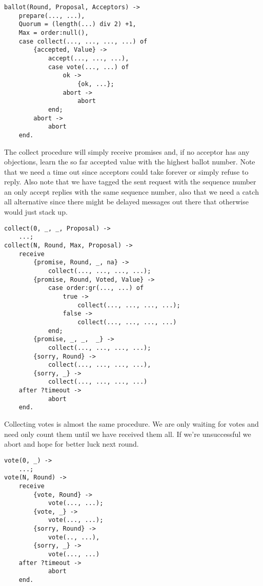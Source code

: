 \documentclass[a4paper,11pt]{article}
\begin{document}
\begin{verbatim}
ballot(Round, Proposal, Acceptors) ->
    prepare(..., ...),
    Quorum = (length(...) div 2) +1,
    Max = order:null(),
    case collect(..., ..., ..., ...) of
        {accepted, Value} ->
            accept(..., ..., ...),
            case vote(..., ...) of
                ok ->
                    {ok, ...};
                abort ->
                    abort
            end;
        abort ->
            abort
    end.
\end{verbatim}

The collect procedure will simply receive promises and, if no acceptor
has any objections, learn the so far accepted value with the highest
ballot number. Note that we need a time out since acceptors could take
forever or simply refuse to reply. Also note that we have tagged the
sent request with the sequence number an only accept replies with the
same sequence number, also that we need a catch all alternative since
there might be delayed messages out there that otherwise would just
stack up.

\begin{verbatim}
collect(0, _, _, Proposal) ->
    ...;
collect(N, Round, Max, Proposal) ->
    receive 
        {promise, Round, _, na} ->
            collect(..., ..., ..., ...);
        {promise, Round, Voted, Value} ->
            case order:gr(..., ...) of
                true ->
                    collect(..., ..., ..., ...);
                false ->
                    collect(..., ..., ..., ...)
            end;
        {promise, _, _,  _} ->
            collect(..., ..., ..., ...);
        {sorry, Round} ->
            collect(..., ..., ..., ...),
        {sorry, _} ->
            collect(..., ..., ..., ...)
    after ?timeout ->
            abort
    end.
\end{verbatim}

Collecting votes is almost the same procedure. We are only waiting for
votes and need only count them until we have received them all. If
we're unsuccessful we abort and hope for better luck next round.

\begin{verbatim}
vote(0, _) ->
    ...;
vote(N, Round) ->
    receive
        {vote, Round} ->
            vote(..., ...);
        {vote, _} ->
            vote(..., ...);
        {sorry, Round} ->
            vote(.., ...),
        {sorry, _} ->
            vote(..., ...)
    after ?timeout ->
            abort
    end.
\end{verbatim}
\end{document}

